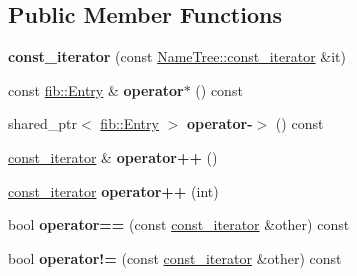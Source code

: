 \subsection*{Public Member Functions}
\begin{DoxyCompactItemize}
\item 
{\bfseries const\+\_\+iterator} (const \hyperlink{classnfd_1_1NameTree_1_1const__iterator}{Name\+Tree\+::const\+\_\+iterator} \&it)\hypertarget{classnfd_1_1Fib_1_1const__iterator_a0042c44842441fa6c2203066c7d7c720}{}\label{classnfd_1_1Fib_1_1const__iterator_a0042c44842441fa6c2203066c7d7c720}

\item 
const \hyperlink{classnfd_1_1fib_1_1Entry}{fib\+::\+Entry} \& {\bfseries operator$\ast$} () const\hypertarget{classnfd_1_1Fib_1_1const__iterator_ab9836268b145cb57f87e508c602f96f7}{}\label{classnfd_1_1Fib_1_1const__iterator_ab9836268b145cb57f87e508c602f96f7}

\item 
shared\+\_\+ptr$<$ \hyperlink{classnfd_1_1fib_1_1Entry}{fib\+::\+Entry} $>$ {\bfseries operator-\/$>$} () const\hypertarget{classnfd_1_1Fib_1_1const__iterator_ad49f6d07738e232920a8704172fea61e}{}\label{classnfd_1_1Fib_1_1const__iterator_ad49f6d07738e232920a8704172fea61e}

\item 
\hyperlink{classnfd_1_1Fib_1_1const__iterator}{const\+\_\+iterator} \& {\bfseries operator++} ()\hypertarget{classnfd_1_1Fib_1_1const__iterator_a68cc4d46f3acc294977d36cf0925b163}{}\label{classnfd_1_1Fib_1_1const__iterator_a68cc4d46f3acc294977d36cf0925b163}

\item 
\hyperlink{classnfd_1_1Fib_1_1const__iterator}{const\+\_\+iterator} {\bfseries operator++} (int)\hypertarget{classnfd_1_1Fib_1_1const__iterator_aef05ca875cd650bd7adef13032bd1914}{}\label{classnfd_1_1Fib_1_1const__iterator_aef05ca875cd650bd7adef13032bd1914}

\item 
bool {\bfseries operator==} (const \hyperlink{classnfd_1_1Fib_1_1const__iterator}{const\+\_\+iterator} \&other) const\hypertarget{classnfd_1_1Fib_1_1const__iterator_af34d91d02edfd069899fabc6d1930c33}{}\label{classnfd_1_1Fib_1_1const__iterator_af34d91d02edfd069899fabc6d1930c33}

\item 
bool {\bfseries operator!=} (const \hyperlink{classnfd_1_1Fib_1_1const__iterator}{const\+\_\+iterator} \&other) const\hypertarget{classnfd_1_1Fib_1_1const__iterator_ae8d9e3ae79f7eee6d05d30c58eebd23b}{}\label{classnfd_1_1Fib_1_1const__iterator_ae8d9e3ae79f7eee6d05d30c58eebd23b}

\end{DoxyCompactItemize}


